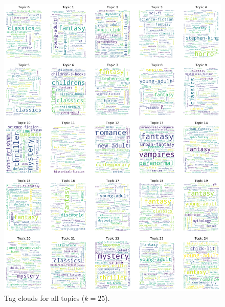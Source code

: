 \documentclass[11pt]{article}
\begin{document}
\begin{figure}[p]
    \centering
    \includegraphics[height=0.9\textheight]{../image/goodreads-topics-profiles-recommendations/tag-cloud-25-tall.png}
    \caption[Tag Clouds ($k=25$)]{Tag clouds for all topics ($k=25$).}
     \label{fig:tag-cloud-25}
\end{figure}







% 
%
%
%  
\end{document}
